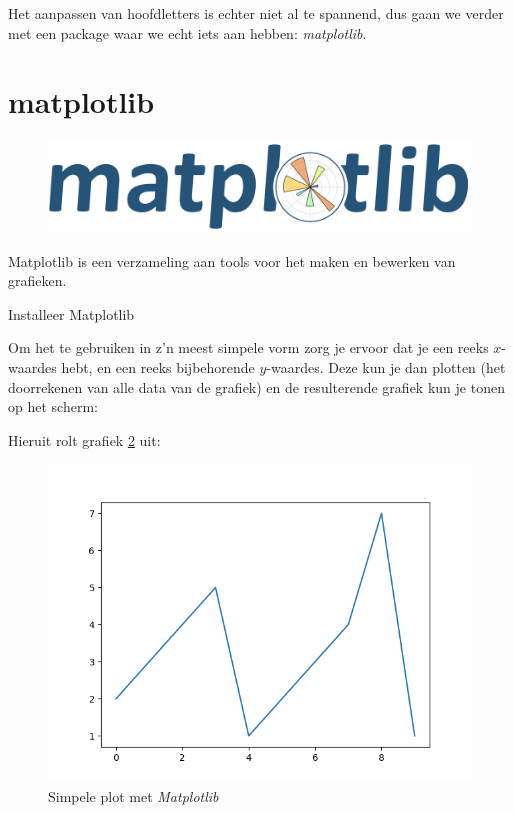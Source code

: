 Het aanpassen van hoofdletters is echter niet al te spannend, dus gaan we verder met een package waar we echt iets aan hebben: \textit{matplotlib}. 

\newpage
\section{matplotlib}

\begin{figure}[!ht]
\centering\includegraphics[scale=0.25]{Pictures/chapter07/matplotlib_logo.png}
\label{fig:mpllogo} %
\end{figure}

Matplotlib is een verzameling aan tools voor het maken en bewerken van grafieken. 
\begin{exercise}
  Installeer Matplotlib
\end{exercise}

Om het te gebruiken in z'n meest simpele vorm zorg je ervoor dat je een reeks $x$-waardes hebt, en een reeks bijbehorende $y$-waardes. Deze kun je dan plotten (het doorrekenen van alle data van de grafiek) en de resulterende grafiek kun je tonen op het scherm:


Hieruit rolt grafiek \ref{fig:plot1} uit:
\begin{figure}[!ht]
\centering\includegraphics[scale=0.7]{Pictures/chapter07/plot1.png}
\caption{Simpele plot met \textit{Matplotlib}}
\label{fig:plot1} %
\end{figure}

